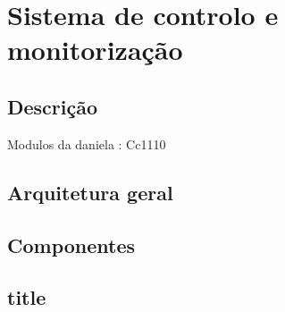 


\chapter{Sistema de controlo e monitorização}

\section{Descrição}


Modulos da daniela : Cc1110



\section{Arquitetura geral}


\section{Componentes}

\section{title}